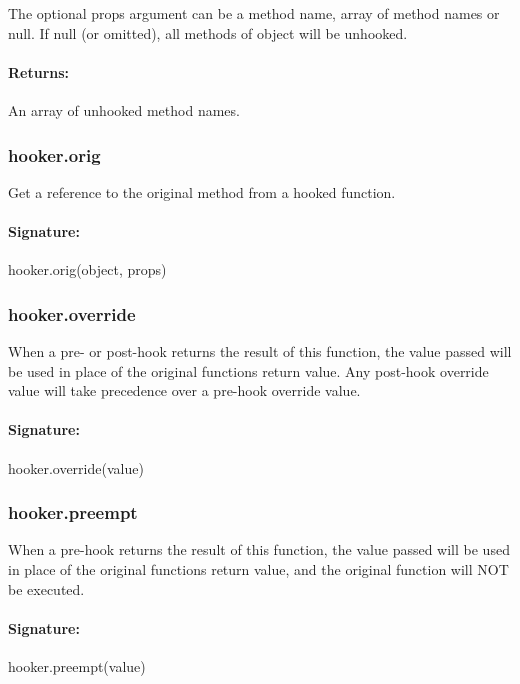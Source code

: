 The optional {\ttfamily props} argument can be a method name, array of method names or null. If null (or omitted), all methods of {\ttfamily object} will be unhooked. \paragraph*{Returns\+:}

An array of unhooked method names.

\subsubsection*{hooker.\+orig}

Get a reference to the original method from a hooked function. \paragraph*{Signature\+:}

{\ttfamily hooker.\+orig(object, props)}

\subsubsection*{hooker.\+override}

When a pre-\/ or post-\/hook returns the result of this function, the value passed will be used in place of the original function\textquotesingle{}s return value. Any post-\/hook override value will take precedence over a pre-\/hook override value. \paragraph*{Signature\+:}

{\ttfamily hooker.\+override(value)}

\subsubsection*{hooker.\+preempt}

When a pre-\/hook returns the result of this function, the value passed will be used in place of the original function\textquotesingle{}s return value, and the original function will N\+OT be executed. \paragraph*{Signature\+:}

{\ttfamily hooker.\+preempt(value)}

